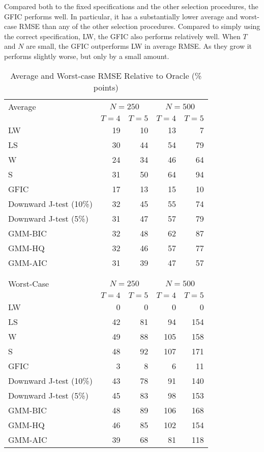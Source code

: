 Compared both to the fixed specifications and the other selection procedures, the GFIC performs well. 
In particular, it has a substantially lower average and worst-case RMSE than any of the other selection procedures.
Compared to simply using the correct specification, LW, the GFIC also performs relatively well. 
When $T$ and $N$ are small, the GFIC outperforms LW in average RMSE. 
As they grow it performs slightly worse, but only by a small amount.


\begin{table}[!tbp]
\begin{center}
\begin{tabular}{lrrrr}
\hline\hline
\multicolumn{1}{l}{Average}&\multicolumn{2}{c}{$N = 250$}&\multicolumn{2}{c}{$N = 500$}\\
&\multicolumn{1}{c}{$T=4$}&\multicolumn{1}{c}{$T=5$}&\multicolumn{1}{c}{$T=4$}&\multicolumn{1}{c}{$T=5$}\tabularnewline
\hline
LW&19&10&13& 7\tabularnewline
LS&30&44&54&79\tabularnewline
W&24&34&46&64\tabularnewline
S&31&50&64&94\tabularnewline
\hline
GFIC&17&13&15&10\tabularnewline
Downward J-test (10\%)&32&45&55&74\tabularnewline
Downward J-test (5\%)&31&47&57&79\tabularnewline
GMM-BIC&32&48&62&87\tabularnewline
GMM-HQ&32&46&57&77\tabularnewline
GMM-AIC&31&39&47&57\tabularnewline
\hline\\ \\ 

\hline\hline
\multicolumn{1}{l}{Worst-Case}&\multicolumn{2}{c}{$N = 250$}&\multicolumn{2}{c}{$N = 500$}\\
&\multicolumn{1}{c}{$T=4$}&\multicolumn{1}{c}{$T=5$}&\multicolumn{1}{c}{$T=4$}&\multicolumn{1}{c}{$T=5$}\tabularnewline
\hline
LW& 0& 0&  0&  0\tabularnewline
LS&42&81& 94&154\tabularnewline
W&49&88&105&158\tabularnewline
S&48&92&107&171\tabularnewline
\hline
GFIC& 3& 8&  6& 11\tabularnewline
Downward J-test (10\%)&43&78& 91&140\tabularnewline
Downward J-test (5\%)&45&83& 98&153\tabularnewline
GMM-BIC&48&89&106&168\tabularnewline
GMM-HQ&46&85&102&154\tabularnewline
GMM-AIC&39&68& 81&118\tabularnewline
\hline

\end{tabular}
\end{center}
\caption{Average and Worst-case RMSE Relative to Oracle (\% points)}
\label{tab:rel}
\end{table}


